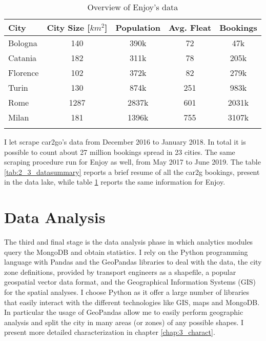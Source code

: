 \begin{table}
	\setlength{\tabcolsep}{2.3pt}
	\centering
	\caption{Overview of Enjoy's data}
	\begin{tabular}{lcccc}
		\hline
		City &  City Size [$km^2$]\footnotemark[\value{footnote}] & Population \footnotemark[\value{footnote}] &  Avg. Fleat & Bookings\\ 
		\hline
		\hline
		Bologna			         &140    & 390k & 72 & 47k \\
		Catania			          &182    & 311k & 78 & 205k \\	
		Florence 	  			 & 102  & 372k & 82 & 279k \\
		Turin 					   & 130   & 874k & 251 & 983k \\
		Rome 					  & 1287 & 2837k & 601 & 2031k \\
		Milan 					   & 181   & 1396k & 755 & 3107k \\



		\hline
		\label{tab:2_3_datasummary_enjoy}
	\end{tabular}
\end{table}


I let \tool scrape car2go's data from December 2016 to January 2018. In total it is possible to count about 27 million bookings spread in 23 cities. The same scraping procedure run for Enjoy as well, from May 2017 to June 2019.  The table \ref{tab:2_3_datasummary} reports a brief resume of all the car2g bookings, present in the data lake, while table \ref{tab:2_3_datasummary_enjoy} reports the same information for Enjoy.




\section{Data Analysis}
\label{sec:2_5_data_analysyes}
The third and final stage is the data analysis phase in which analytics modules query the MongoDB and obtain statistics. I rely on the Python programming language with Pandas and the GeoPandas libraries to deal with the data, the city zone definitions, provided by transport engineers as a shapefile, a popular geospatial vector data format, and the Geographical Information Systems (GIS) for the spatial analyses. I choose Python as it offer a large number of  libraries that easily interact with the different technologies like GIS, maps and MongoDB. In particular the usage of GeoPandas allow me to easily perform geographic analysis and split the city in many areas (or zones) of any possible shapes. I present more detailed characterization in chapter \ref{chap:3_charact}.


